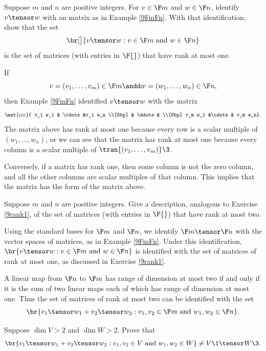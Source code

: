 \exercise
Suppose $m$ and $n$ are positive integers. For $v \in \F m$ and $w \in \F n$, identify $v \tensor w$ with an  matrix as in Example \ref{9FmFn}. With that identification, show that the set\label{9rank1}
\[
\br[\big]{ v \tensor w : v \in \F m \text{ and } w \in \F n }
\]
is the set of  matrices (with entries in $\F{}$) that have rank at most one.

\begin{Solution}
If
\[
v = (v_1, \ldots, v_m) \in \F m \andd w = (w_1, \ldots, w_n) \in \F n,
\]
then Example \ref{9FmFn} identified $v \tensor w$ with the  matrix
\[
\mat{ccc}{
v_1 w_1 & \cdots &v_1 w_n \\[6bp]
& \ddots & \\[6bp]
v_m w_1 &\cdots & v_m w_n}.
\]
The matrix above has rank at most one because every row is a scalar multiple of $(w_1, \ldots, w_n)$, or we can see that the matrix has rank at most one because every column is a scalar multiple of $\tran{(v_1, \ldots, v_m)}\3$.

Conversely, if a matrix has rank one, then some column is not the zero column, and all the other columns are scalar multiples of that column. This implies that the matrix has the form of the matrix above.
\end{Solution}

\exercise
Suppose $m$ and $n$ are positive integers. Give a description, analogous to Exercise \ref{9rank1}, of the set of  matrices (with entries in $\F{}$) that have rank at most two.\label{9rank2}

\begin{Solution}
Using the standard bases for $\F m$ and $\F n$, we identify $\F m \tensor \F n$ with the vector spaces of  matrices, as in Example \ref{9FmFn}. Under this identification, $\br{ v \tensor w : v \in \F m \text{ and } w \in \F n }$ is identified with the set of matrices of rank at most one, as discussed in Exercise \ref{9rank1}.

A linear map from $\F n$ to $\F m$ has range of dimension at most two if and only if it is the sum of  two linear maps each of which has range of dimension at most one. Thus the set of  matrices of rank at most two can be identified with the set
\[
\br{ v_1 \tensor w_1 + v_2 \tensor w_2 : v_1, v_2 \in \F m \text{ and } w_1, w_2  \in \F n }.
\]
\end{Solution}

\exercise
Suppose $\dim V > 2$ and $\dim W > 2$. Prove that
\[
\br{ v_1 \tensor w_1 + v_2 \tensor w_2 : v_1, v_2 \in V \text{ and } w_1, w_2 \in W } \ne V\1 \tensor W\3.
\]
\exercisedisplayend

